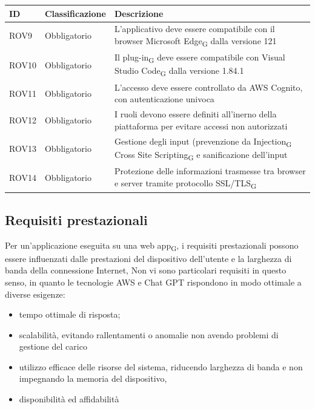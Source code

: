 \documentclass{article}
\begin{document}
\newpage
\begin{center}
\begin{tabular}{|p{3cm}|p{3cm}|p{6cm}|}
\rowcolor{Blue} 
\hline
ID & Classificazione & Descrizione \\
\hline
\rowcolor{LighterBlue} 
ROV9 & Obbligatorio & L'applicativo deve essere compatibile con il browser Microsoft Edge\textsubscript{G} dalla versione 121\\
\hline
\rowcolor{LightBlue}
ROV10 & Obbligatorio & Il plug-in\textsubscript{G} deve essere compatibile con Visual Studio Code\textsubscript{G} dalla versione 1.84.1\\
\hline
\rowcolor{LighterBlue}
ROV11 & Obbligatorio & L'accesso deve essere controllato da AWS Cognito, con autenticazione univoca\\
\hline
\rowcolor{LightBlue}
ROV12 & Obbligatorio & I ruoli devono essere definiti all'inerno della piattaforma per evitare accessi non autorizzati\\
\hline
\rowcolor{LighterBlue}
ROV13 & Obbligatorio & Gestione degli input (prevenzione da Injection\textsubscript{G} Cross Site Scripting\textsubscript{G} e sanificazione dell'input\\
\hline
\rowcolor{LightBlue}
ROV14 & Obbligatorio & Protezione delle informazioni trasmesse tra browser e server tramite protocollo SSL/TLS\textsubscript{G}\\
\hline
\end{tabular}
\label{tab:reqvincolo}
\end{center}

\subsection{Requisiti prestazionali}
Per un'applicazione eseguita su una web app\textsubscript{G}, i requisiti prestazionali possono essere influenzati dalle prestazioni del dispositivo dell'utente e la larghezza di banda della connessione Internet, Non vi sono particolari requisiti in questo senso, in quanto le tecnologie AWS e Chat GPT rispondono in modo ottimale a diverse esigenze:
\begin{itemize}
\item tempo ottimale di risposta;
\item scalabilità, evitando rallentamenti o anomalie non avendo problemi di gestione del carico 
\item utilizzo efficace delle risorse del sistema, riducendo larghezza di banda e non impegnando la memoria del dispositivo, 
\item disponibilità ed affidabilità
\end{itemize}
\end{document}
